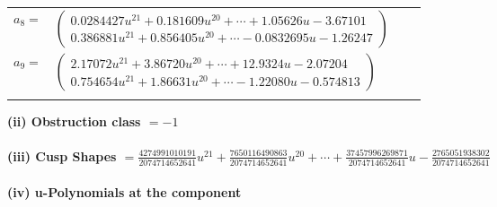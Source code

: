 \documentclass[1p]{elsarticle_modified}
\theoremstyle{definition}
\begin{document}
\begin{tabular}{m{7pt} m{180pt} m{7pt} m{180pt} }
\flushright $a_{8}=$&$\begin{pmatrix}0.0284427 u^{21}+0.181609 u^{20}+\cdots+1.05626 u-3.67101\\0.386881 u^{21}+0.856405 u^{20}+\cdots-0.0832695 u-1.26247\end{pmatrix}$ \\
\flushright $a_{9}=$&$\begin{pmatrix}2.17072 u^{21}+3.86720 u^{20}+\cdots+12.9324 u-2.07204\\0.754654 u^{21}+1.86631 u^{20}+\cdots-1.22080 u-0.574813\end{pmatrix}$\\&\end{tabular}
\flushleft \textbf{(ii) Obstruction class $= -1$}\\~\\
\flushleft \textbf{(iii) Cusp Shapes $= \frac{4274991010191}{2074714652641} u^{21}+\frac{7650116490863}{2074714652641} u^{20}+\cdots+\frac{37457996269871}{2074714652641} u-\frac{2765051938302}{2074714652641}$}\\~\\
\newpage\renewcommand{\arraystretch}{1}
\flushleft \textbf{(iv) u-Polynomials at the component}\newline \\
\end{document}
